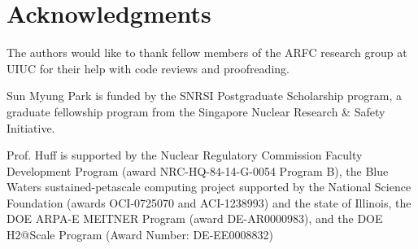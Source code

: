\section{Acknowledgments}
The authors would like to thank fellow members of the ARFC research group at
UIUC for their help with code reviews and proofreading.

Sun Myung Park is funded by the SNRSI Postgraduate Scholarship program, a
graduate fellowship program from the Singapore Nuclear Research \& Safety
Initiative.

Prof. Huff is supported by the Nuclear Regulatory Commission Faculty
Development Program (award NRC-HQ-84-14-G-0054 Program B), the Blue Waters
sustained-petascale computing project supported by the National Science
Foundation (awards OCI-0725070 and ACI-1238993) and the state of Illinois, the
DOE ARPA-E MEITNER Program (award DE-AR0000983), and the DOE H2@Scale Program
(Award Number: DE-EE0008832)
